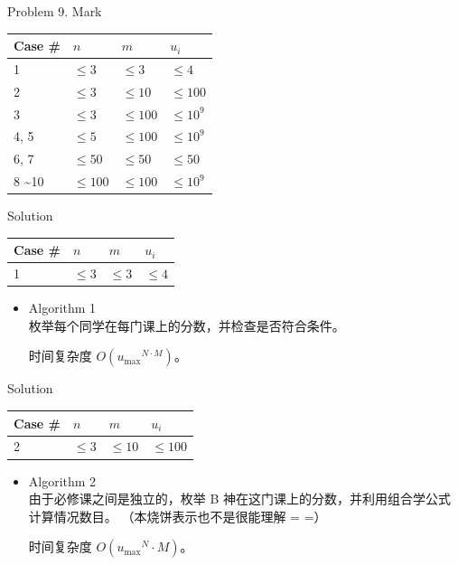\documentclass[UTF8]{beamer}
\begin{document}
\begin{frame}{Problem 9. Mark}

\begin{tabularx}{\textwidth}{X|X|X|X} \hline
Case \# & $n$ & $m$ & $u_i$ \\ \hline \hline
1    & $\leq 3$   & $\leq 3$   & $\leq 4$    \\ \hline
2    & $\leq 3$   & $\leq 10$  & $\leq 100$  \\ \hline
3    & $\leq 3$   & $\leq 100$ & $\leq 10^9$ \\ \hline
4, 5 & $\leq 5$   & $\leq 100$ & $\leq 10^9$ \\ \hline
6, 7 & $\leq 50$  & $\leq 50$  & $\leq 50$   \\ \hline
8 \textasciitilde 10 & $\leq 100$ & $\leq 100$ & $\leq 10^9$ \\ \hline
\end{tabularx}

\end{frame}

\begin{frame}{Solution}

\begin{tabularx}{\textwidth}{X|X|X|X} \hline
Case \# & $n$ & $m$ & $u_i$ \\ \hline \hline
1    & $\leq 3$   & $\leq 3$   & $\leq 4$    \\ \hline
\end{tabularx}
\begin{itemize}
    \item Algorithm 1 \\
        枚举每个同学在每门课上的分数，并检查是否符合条件。

        时间复杂度 $O({u_{\max}}^{N \cdot M})$。
\end{itemize}

\end{frame}

\begin{frame}{Solution}

\begin{tabularx}{\textwidth}{X|X|X|X} \hline
Case \# & $n$ & $m$ & $u_i$ \\ \hline \hline
2    & $\leq 3$   & $\leq 10$  & $\leq 100$  \\ \hline
\end{tabularx}
\begin{itemize}
    \item Algorithm 2 \\
        由于必修课之间是独立的，枚举 B 神在这门课上的分数，并利用组合学公式计算情况数目。
        （本烧饼表示也不是很能理解 = =）

        时间复杂度 $O({u_{\max}}^N \cdot M)$。
\end{itemize}

\end{frame}
\end{document}
